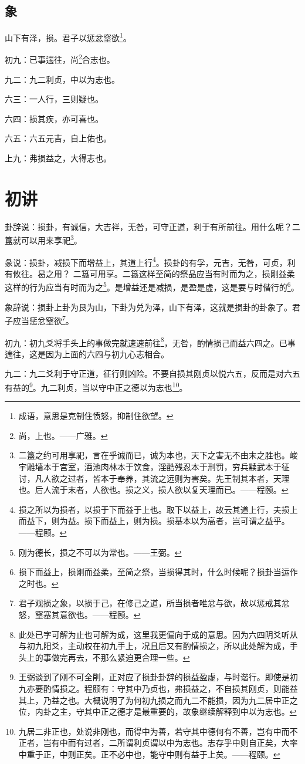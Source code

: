 \documentclass[12pt,oneside]{book}
\begin{document}
\subsection{象}
山下有泽，损。君子以惩忿窒欲\footnote{成语，意思是克制住愤怒，抑制住欲望。}。

初九：已事遄往，尚\footnote{尚，上也。——广雅。}合志也。

九二：九二利贞，中以为志也。

六三：一人行，三则疑也。

六四：损其疾，亦可喜也。

六五：六五元吉，自上佑也。

上九：弗损益之，大得志也。

\section{初讲}
卦辞说：损卦，有诚信，大吉祥，无咎，可守正道，利于有所前往。用什么呢？二簋就可以用来享祀\footnote{二簋之约可用享祀，言在乎诚而已，诚为本也，天下之害无不由末之胜也。峻宇雕墙本于宫室，酒池肉林本于饮食，淫酷残忍本于刑罚，穷兵黩武本于征讨，凡人欲之过者，皆本于奉养，其流之远则为害矣。先王制其本者，天理也。后人流于末者，人欲也。损之义，损人欲以复天理而已。——程颐。}。

彖说：损卦，减损下而增益上，其道上行\footnote{损之所以为损者，以损于下而益于上也。取下以益上，故云其道上行，夫损上而益下，则为益。损下而益上，则为损。损基本以为高者，岂可谓之益乎。——程颐。}。损卦的有孚，元吉，无咎，可贞，利有攸往。曷之用？ 二簋可用享。二簋这样至简的祭品应当有时而为之，损刚益柔这样的行为应当有时而为之\footnote{刚为德长，损之不可以为常也。——王弼。}。是增益还是减损，是盈是虚，这是要与时偕行的\footnote{损下而益上，损刚而益柔，至简之祭，当损得其时，什么时候呢？损卦当运作之时也。}。

象辞说：损卦上卦为艮为山，下卦为兑为泽，山下有泽，这就是损卦的卦象了。君子应当惩忿窒欲\footnote{君子观损之象，以损于己，在修己之道，所当损者唯忿与欲，故以惩戒其忿怒，窒塞其意欲也。——程颐。}。

初九：初九爻将手头上的事做完就速速前往\footnote{此处已字可解为止也可解为成，这里我更偏向于成的意思。因为六四阴爻听从与初九阳爻，主动权在初九手上，况且后又有酌情损之，所以此处解为成，手头上的事做完再去，不那么紧迫更合理一些。}，无咎，酌情损己而益六四之。已事遄往，这是因为上面的六四与初九心志相合。

九二：九二爻利于守正道，征行则凶险。不要自损其刚贞以悦六五，反而是对六五有益的\footnote{王弼谈到了刚不可全削，正对应了损卦卦辞的损益盈虚，与时谐行。即使是初九亦要酌情损之。程颐有：守其中乃贞也，弗损益之，不自损其刚贞，则能益其上，乃益之也。大概说明了为何初九损之而九二不能损，因为九二居中正之位，内卦之主，守其中正之德才是最重要的，故象继续解释到中以为志也。}。九二利贞，当以守中正之德以为志也\footnote{九居二非正也，处说非刚也，而得中为善，若守其中德何有不善，岂有中而不正者，岂有中而有过者，二所谓利贞谓以中为志也。志存乎中则自正矣，大率中重于正，中则正矣。正不必中也，能守中则有益于上矣。——程颐。}。
\end{document}
